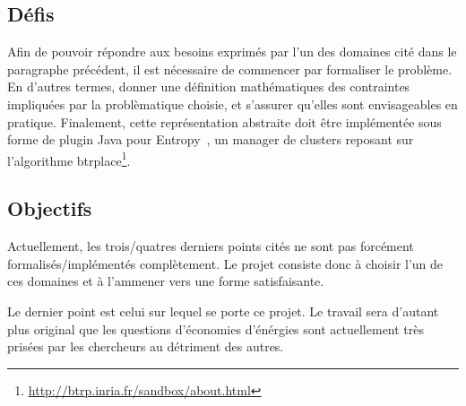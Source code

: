 \documentclass[a4paper]{article}
\begin{document}
\subsection{Défis}
Afin de pouvoir répondre aux besoins exprimés par l'un des domaines
cité dans le paragraphe précédent, il est nécessaire de commencer
par formaliser le problème. En d'autres termes, donner une définition
mathématiques des contraintes impliquées par la problèmatique choisie,
et s'assurer qu'elles sont envisageables en pratique. Finalement, cette
représentation abstraite doit être implémentée sous forme de plugin
Java pour Entropy~\cite{herm2009}, un manager de clusters reposant sur
l'algorithme btrplace\footnote{\url{http://btrp.inria.fr/sandbox/about.html}}.

\subsection{Objectifs}
Actuellement, les trois/quatres derniers points cités ne sont pas forcément
formalisés/implémentés complètement. Le projet consiste donc à choisir l'un
de ces domaines et à l'ammener vers une forme satisfaisante.

Le dernier point est celui sur lequel se porte ce projet. Le travail sera
d'autant plus original que les questions d'économies d'énérgies sont actuellement
très prisées par les chercheurs au détriment des autres.
\end{document}
